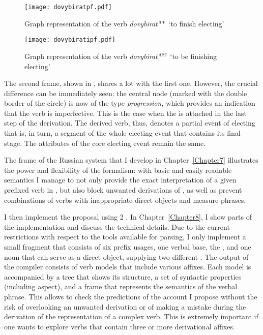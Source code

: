 \begin{figure}[p]
\texttt{[image: dovybiratpf.pdf]}
\caption{Graph representation of the verb \textit{dovybirat'}$^{\textsc{pf}}$ `to finish electing'\label{graph:pf}}
\end{figure}

\begin{figure}[p]
\texttt{[image: dovybiratipf.pdf]}
\caption{Graph representation of the verb \textit{dovybirat'}$^{\textsc{ipf}}$ `to be finishing electing'\label{graph:ipf}}
\end{figure}

The second frame, shown in , shares a lot with the first one. However, the crucial difference can be immediately seen: the central node (marked with the double border of the circle) is now of the type \textit{progression,} which provides an indication that the verb is imperfective. This is the case when the  is attached in the last step of the derivation. The derived verb, thus, denotes a partial event of electing that is, in turn, a segment of the whole electing event that contains its final stage. The attributes of the core electing event remain the same.

The frame  of the Russian  system that I develop in Chapter~\ref{Chapter7} illustrates the power and flexibility of the formalism: with basic and easily readable semantics I manage to not only provide the exact interpretation of a given prefixed verb in , but also block unwanted derivations of , as well as prevent combinations of verbs with inappropriate direct objects and measure phrases.

I then implement the proposal using  2 \citep{Petitjean:16}. In Chapter~\ref{Chapter8}, I show parts of the implementation and discuss the technical details. Due to the current restrictions with respect to the tools available for parsing, I only implement a small fragment that consists of six prefix usages, one verbal base, the , and one noun that can serve as a direct object, supplying two different . The output of the compiler consists of verb models that include various affixes. Each model is accompanied by a tree that shows its  structure, a set of syntactic properties (including aspect), and a frame that represents the  semantics of the verbal phrase. This allows to check the predictions of the account I propose without the risk of overlooking an unwanted derivation or of making a mistake during the derivation of the representation of a complex verb. This is extremely important if one wants to explore verbs that contain three or more derivational affixes.

